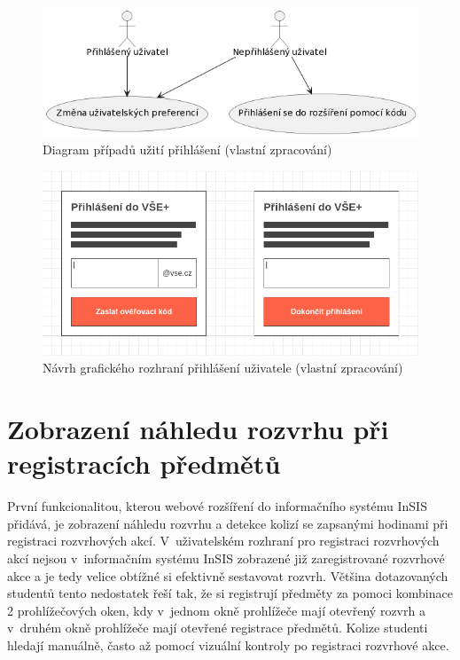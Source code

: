 \begin{figure}[htbp!]\centering
    \includegraphics[width=\textwidth]{img/uc-prihlaseni.png}
    \caption{Diagram případů užití přihlášení (vlastní zpracování)}
    \label{fig:usecase-prihlaseni}
\end{figure}

\begin{figure}[htbp!]\centering
    \includegraphics[width=\textwidth]{img/wireframe-autentikace.png}
    \caption{Návrh grafického rozhraní přihlášení uživatele (vlastní zpracování)}
    \label{fig:autentikace-wireframe}
\end{figure}


\section{Zobrazení náhledu rozvrhu při registracích předmětů}

První funkcionalitou, kterou webové rozšíření do informačního systému InSIS přidává, je zobrazení náhledu rozvrhu a detekce kolizí se zapsanými hodinami při registraci rozvrhových akcí. V~uživatelském rozhraní pro registraci rozvrhových akcí nejsou v~informačním systému InSIS zobrazené již zaregistrované rozvrhové akce a je tedy velice obtížné si efektivně sestavovat rozvrh. Většina dotazovaných studentů tento nedostatek řeší tak, že si registrují předměty za pomoci kombinace 2 prohlížečových oken, kdy v~jednom okně prohlížeče mají otevřený rozvrh a v~druhém okně prohlížeče mají otevřené registrace předmětů. Kolize studenti hledají manuálně, často až pomocí vizuální kontroly po registraci rozvrhové akce.

